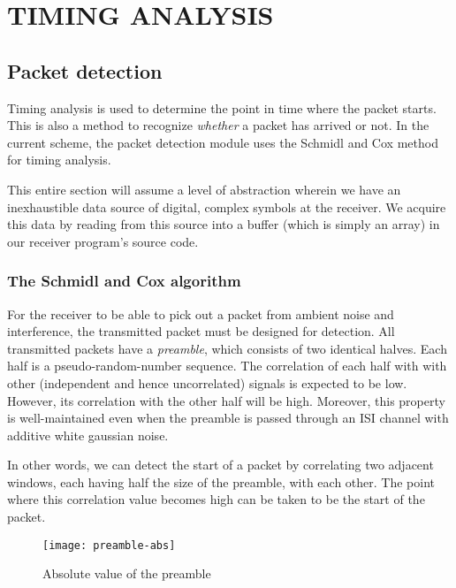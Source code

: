 \chapter{TIMING ANALYSIS}
\label{chap:timing}


\section{Packet detection}

Timing analysis is used to determine the point in time where the packet starts.
This is also a method to recognize \emph{whether} a packet has arrived or not.
In the current scheme, the packet detection module uses the Schmidl and Cox
method \citep{SchmidlCox1997} for timing analysis.

This entire section will assume a level of abstraction wherein we have an
inexhaustible data source of digital, complex symbols at the receiver. We
acquire this data by reading from this source into a buffer (which is simply an
array) in our receiver program's source code.

\subsection{The Schmidl and Cox algorithm}

For the receiver to be able to pick out a packet from ambient noise and
interference, the transmitted packet must be designed for detection. All
transmitted packets have a \emph{preamble}, which consists of two identical
halves. Each half is a pseudo-random-number sequence. The correlation of each
half with with other (independent and hence uncorrelated) signals is expected
to be low. However, its correlation with the other half will be high. Moreover,
this property is well-maintained even when the preamble is passed through an
ISI channel with additive white gaussian noise.

In other words, we can detect the start of a packet by correlating two adjacent
windows, each having half the size of the preamble, with each other. The point
where this correlation value becomes high can be taken to be the start of the
packet.

\begin{figure}[h]
	\centering
	\texttt{[image: preamble-abs]}
	\caption{Absolute value of the preamble}
	\label{fig:preamble-abs}
\end{figure}

